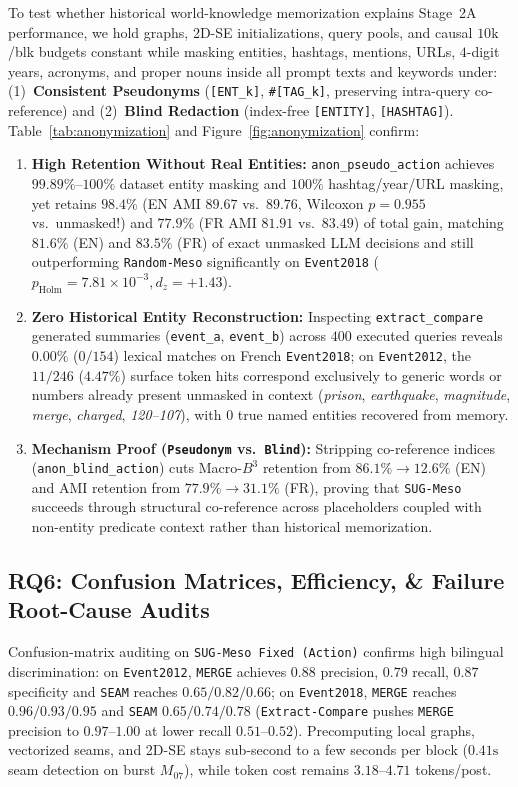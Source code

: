 To test whether historical world-knowledge memorization explains Stage~2A performance, we hold graphs, 2D-SE initializations, query pools, and causal $10\text{k}$/blk budgets constant while masking entities, hashtags, mentions, URLs, $4$-digit years, acronyms, and proper nouns inside all prompt texts and keywords under: (1)~\textbf{Consistent Pseudonyms} (\texttt{[ENT\_k]}, \texttt{\#[TAG\_k]}, preserving intra-query co-reference) and (2)~\textbf{Blind Redaction} (index-free \texttt{[ENTITY]}, \texttt{[HASHTAG]}). Table~\ref{tab:anonymization} and Figure~\ref{fig:anonymization} confirm:
\begin{enumerate}
    \item \textbf{High Retention Without Real Entities:} \texttt{anon\_pseudo\_action} achieves $99.89\%$--$100\%$ dataset entity masking and $100\%$ hashtag/year/URL masking, yet retains \textbf{$98.4\%$} (EN AMI $89.67$ vs.\ $89.76$, Wilcoxon $p=0.955$ vs.\ unmasked!) and \textbf{$77.9\%$} (FR AMI $81.91$ vs.\ $83.49$) of total gain, matching $81.6\%$ (EN) and $83.5\%$ (FR) of exact unmasked LLM decisions and still outperforming \texttt{Random-Meso} significantly on \texttt{Event2018} ($p_{\text{Holm}}=7.81\times 10^{-3}, d_z=+1.43$).
    \item \textbf{Zero Historical Entity Reconstruction:} Inspecting \texttt{extract\_compare} generated summaries (\texttt{event\_a}, \texttt{event\_b}) across $400$ executed queries reveals $0.00\%$ ($0/154$) lexical matches on French \texttt{Event2018}; on \texttt{Event2012}, the $11/246$ ($4.47\%$) surface token hits correspond exclusively to generic words or numbers already present unmasked in context (\emph{prison}, \emph{earthquake}, \emph{magnitude}, \emph{merge}, \emph{charged}, \emph{120--107}), with $0$ true named entities recovered from memory.
    \item \textbf{Mechanism Proof (\texttt{Pseudonym} vs.\ \texttt{Blind}):} Stripping co-reference indices (\texttt{anon\_blind\_action}) cuts Macro-$B^3$ retention from $86.1\% \to 12.6\%$ (EN) and AMI retention from $77.9\% \to 31.1\%$ (FR), proving that \texttt{SUG-Meso} succeeds through structural co-reference across placeholders coupled with non-entity predicate context rather than historical memorization.
\end{enumerate}

\subsection{RQ6: Confusion Matrices, Efficiency, \& Failure Root-Cause Audits}
\label{sec:rq6}
Confusion-matrix auditing on \texttt{SUG-Meso Fixed (Action)} confirms high bilingual discrimination: on \texttt{Event2012}, \texttt{MERGE} achieves $0.88$ precision, $0.79$ recall, $0.87$ specificity and \texttt{SEAM} reaches $0.65 / 0.82 / 0.66$; on \texttt{Event2018}, \texttt{MERGE} reaches $0.96 / 0.93 / 0.95$ and \texttt{SEAM} $0.65 / 0.74 / 0.78$ (\texttt{Extract-Compare} pushes \texttt{MERGE} precision to $0.97$--$1.00$ at lower recall $0.51$--$0.52$). Precomputing local graphs, vectorized seams, and 2D-SE stays sub-second to a few seconds per block ($0.41\text{s}$ seam detection on burst $M_{07}$), while token cost remains $3.18$--$4.71$ tokens/post.

